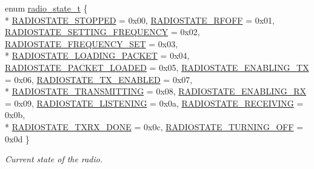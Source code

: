 \begin{DoxyCompactItemize}
\item 
enum \hyperlink{group__radio_ga756adac824be7fdeeac3026997c04711}{radio\+\_\+state\+\_\+t} \{ \\*
\hyperlink{group__radio_gga756adac824be7fdeeac3026997c04711a4a472368c3cb618ae7b28f6f9db2b686}{R\+A\+D\+I\+O\+S\+T\+A\+T\+E\+\_\+\+S\+T\+O\+P\+P\+ED} = 0x00, 
\hyperlink{group__radio_gga756adac824be7fdeeac3026997c04711ab3b930cfe6619763211ab464be4ee61d}{R\+A\+D\+I\+O\+S\+T\+A\+T\+E\+\_\+\+R\+F\+O\+FF} = 0x01, 
\hyperlink{group__radio_gga756adac824be7fdeeac3026997c04711ad7f07ef5968bd0acf916766a4a35b7f5}{R\+A\+D\+I\+O\+S\+T\+A\+T\+E\+\_\+\+S\+E\+T\+T\+I\+N\+G\+\_\+\+F\+R\+E\+Q\+U\+E\+N\+CY} = 0x02, 
\hyperlink{group__radio_gga756adac824be7fdeeac3026997c04711aebe3032ae741fc329b8ff05eeb3254c0}{R\+A\+D\+I\+O\+S\+T\+A\+T\+E\+\_\+\+F\+R\+E\+Q\+U\+E\+N\+C\+Y\+\_\+\+S\+ET} = 0x03, 
\\*
\hyperlink{group__radio_gga756adac824be7fdeeac3026997c04711af1136ffffc880d5cc0be224403dbc4cb}{R\+A\+D\+I\+O\+S\+T\+A\+T\+E\+\_\+\+L\+O\+A\+D\+I\+N\+G\+\_\+\+P\+A\+C\+K\+ET} = 0x04, 
\hyperlink{group__radio_gga756adac824be7fdeeac3026997c04711adf168196e6dd3663f2b86956f0e6ad14}{R\+A\+D\+I\+O\+S\+T\+A\+T\+E\+\_\+\+P\+A\+C\+K\+E\+T\+\_\+\+L\+O\+A\+D\+ED} = 0x05, 
\hyperlink{group__radio_gga756adac824be7fdeeac3026997c04711a47973c5341406bff78166e042706bdaf}{R\+A\+D\+I\+O\+S\+T\+A\+T\+E\+\_\+\+E\+N\+A\+B\+L\+I\+N\+G\+\_\+\+TX} = 0x06, 
\hyperlink{group__radio_gga756adac824be7fdeeac3026997c04711a49ef685b90a4d89e18db297fb272723e}{R\+A\+D\+I\+O\+S\+T\+A\+T\+E\+\_\+\+T\+X\+\_\+\+E\+N\+A\+B\+L\+ED} = 0x07, 
\\*
\hyperlink{group__radio_gga756adac824be7fdeeac3026997c04711a0de6ce96ad2d164514dbfcc0a69f38b7}{R\+A\+D\+I\+O\+S\+T\+A\+T\+E\+\_\+\+T\+R\+A\+N\+S\+M\+I\+T\+T\+I\+NG} = 0x08, 
\hyperlink{group__radio_gga756adac824be7fdeeac3026997c04711aa769a431889db702577592ac9541470f}{R\+A\+D\+I\+O\+S\+T\+A\+T\+E\+\_\+\+E\+N\+A\+B\+L\+I\+N\+G\+\_\+\+RX} = 0x09, 
\hyperlink{group__radio_gga756adac824be7fdeeac3026997c04711af042c2535a82b761cb704e87ef079b68}{R\+A\+D\+I\+O\+S\+T\+A\+T\+E\+\_\+\+L\+I\+S\+T\+E\+N\+I\+NG} = 0x0a, 
\hyperlink{group__radio_gga756adac824be7fdeeac3026997c04711aaf793530bcd155674c287d839740691d}{R\+A\+D\+I\+O\+S\+T\+A\+T\+E\+\_\+\+R\+E\+C\+E\+I\+V\+I\+NG} = 0x0b, 
\\*
\hyperlink{group__radio_gga756adac824be7fdeeac3026997c04711a66ad866b56bc534a2fef656100ef1eed}{R\+A\+D\+I\+O\+S\+T\+A\+T\+E\+\_\+\+T\+X\+R\+X\+\_\+\+D\+O\+NE} = 0x0c, 
\hyperlink{group__radio_gga756adac824be7fdeeac3026997c04711a3964b138560430827cf5b20d583df67f}{R\+A\+D\+I\+O\+S\+T\+A\+T\+E\+\_\+\+T\+U\+R\+N\+I\+N\+G\+\_\+\+O\+FF} = 0x0d
 \}\begin{DoxyCompactList}\small\item\em Current state of the radio. \end{DoxyCompactList}
\end{DoxyCompactItemize}
